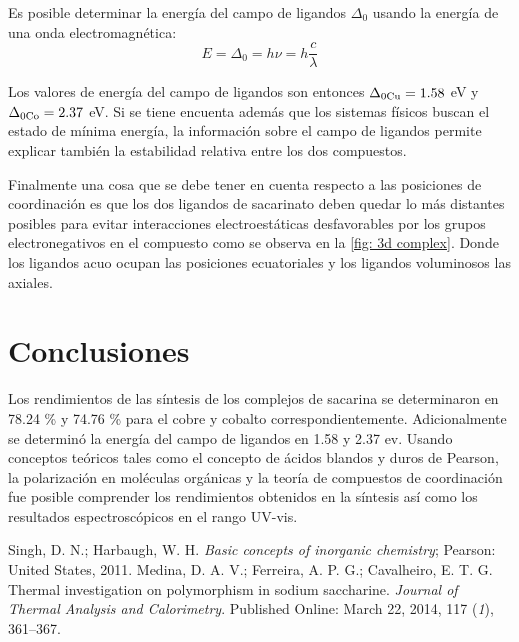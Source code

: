 \documentclass[fleqn,10pt]{SelfArx} %
\begin{document}
	Es posible determinar la energ\'ia del campo de ligandos $\Delta_0$ usando la energ\'ia de una onda electromagn\'etica:
	\begin{equation}
		E = \Delta_0 = h\nu = h\dfrac{c}{\lambda}
	\end{equation}
	
	Los valores de energ\'ia del campo de ligandos son entonces $\Delta_{0\ce{Cu}} = 1.58$ eV y $\Delta_{0\ce{Co}} = 2.37$ eV. Si se tiene encuenta adem\'as que los sistemas f\'isicos buscan el estado de m\'inima energ\'ia, la informaci\'on sobre el campo de ligandos permite explicar tambi\'en la estabilidad relativa entre los dos compuestos.
	
	Finalmente una cosa que se debe tener en cuenta respecto a las posiciones de coordinaci\'on es que los dos ligandos de sacarinato deben quedar lo m\'as distantes posibles para evitar interacciones electroest\'aticas desfavorables por los grupos electronegativos en el compuesto como se observa en la \autoref{fig: 3d complex}. Donde los ligandos acuo ocupan las posiciones ecuatoriales y los ligandos voluminosos las axiales.
	
	\section{Conclusiones}
	Los rendimientos de las s\'intesis de los complejos de sacarina se determinaron en 78.24 \% y 74.76 \% para el cobre y cobalto correspondientemente. Adicionalmente se determin\'o la energ\'ia del campo de ligandos en 1.58 y 2.37 ev. Usando conceptos te\'oricos tales como el concepto de \'acidos blandos y duros de Pearson, la polarizaci\'on en mol\'eculas org\'anicas y la teor\'ia de compuestos de coordinaci\'on fue posible comprender los rendimientos obtenidos en la s\'intesis as\'i como los resultados espectrosc\'opicos en el rango UV-vis.
	
	\begin{thebibliography}{9}
		Singh, D. N.; Harbaugh, W. H. \textit{Basic concepts of inorganic chemistry}; Pearson: United States, 2011.
	    Medina, D. A. V.; Ferreira, A. P. G.; Cavalheiro, E. T. G. Thermal investigation on polymorphism in sodium saccharine. \textit{Journal of Thermal Analysis and Calorimetry}. Published Online: March 22, 2014, 117 (\textit{1}), 361–367.
	\end{thebibliography}
\end{document}
